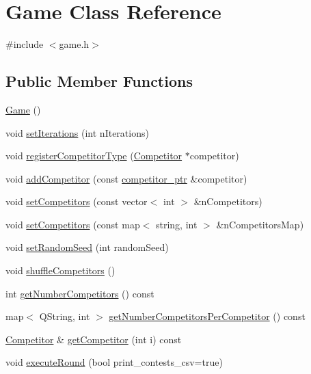 \hypertarget{class_game}{
\section{Game Class Reference}
\label{class_game}
}


{\ttfamily \#include $<$game.h$>$}

\subsection*{Public Member Functions}
\begin{DoxyCompactItemize}
\item 
\hyperlink{class_game_ad59df6562a58a614fda24622d3715b65}{Game} ()
\item 
void \hyperlink{class_game_a4c460a9eddcae95dce1a256d55a5abbf}{setIterations} (int nIterations)
\item 
void \hyperlink{class_game_a4a2af4c6019f91564218843a6400d4c8}{registerCompetitorType} (\hyperlink{class_competitor}{Competitor} $\ast$competitor)
\item 
void \hyperlink{class_game_a5fc45307356cdd4b3c6135be48435a2f}{addCompetitor} (const \hyperlink{competitor_8h_ad3b7daf7203407600f24df677706efd3}{competitor\_\-ptr} \&competitor)
\item 
void \hyperlink{class_game_a4447bfad550c1e60220ef14146a65bf3}{setCompetitors} (const vector$<$ int $>$ \&nCompetitors)
\item 
void \hyperlink{class_game_ae1dd5c1a220ed674e0718d985a8a5ba3}{setCompetitors} (const map$<$ string, int $>$ \&nCompetitorsMap)
\item 
void \hyperlink{class_game_a1f9d4bdbcdd4a087be8f01b238afd4fb}{setRandomSeed} (int randomSeed)
\item 
void \hyperlink{class_game_a96bab56aca0c477e1541a1c988db0806}{shuffleCompetitors} ()
\item 
int \hyperlink{class_game_ab5f306bb166999e63e2ee05e0bbaacd5}{getNumberCompetitors} () const 
\item 
map$<$ QString, int $>$ \hyperlink{class_game_a658a753770db51eca96fb822d680c338}{getNumberCompetitorsPerCompetitor} () const 
\item 
\hyperlink{class_competitor}{Competitor} \& \hyperlink{class_game_af90b448790f806ff64507b9d4bd6e324}{getCompetitor} (int i) const 
\item 
void \hyperlink{class_game_ab19ca40bb3af62687285bc8760d33cd1}{executeRound} (bool print\_\-contests\_\-csv=true)
\item 

\end{DoxyCompactItemize}

